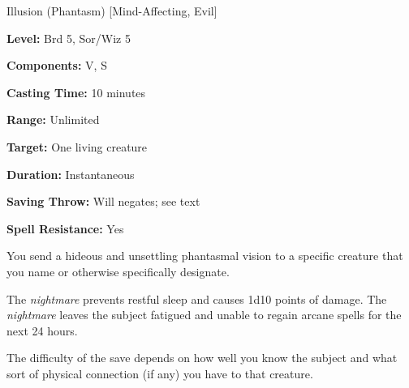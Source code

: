 
Illusion (Phantasm) [Mind-Affecting, Evil]

\textbf{Level:} Brd 5, Sor/Wiz 5

\textbf{Components:} V, S

\textbf{Casting Time:} 10 minutes

\textbf{Range:} Unlimited

\textbf{Target:} One living creature

\textbf{Duration:} Instantaneous

\textbf{Saving Throw:} Will negates; see text

\textbf{Spell Resistance:} Yes

You send a hideous and unsettling phantasmal vision to a specific creature that 
you name or otherwise specifically designate.

The \textit{nightmare} prevents restful sleep and causes 1d10 points of damage. 
The \textit{nightmare} leaves the subject fatigued and unable to regain arcane 
spells for the next 24 hours.

The difficulty of the save depends on how well you know the subject and what sort 
of physical connection (if any) you have to that creature.

